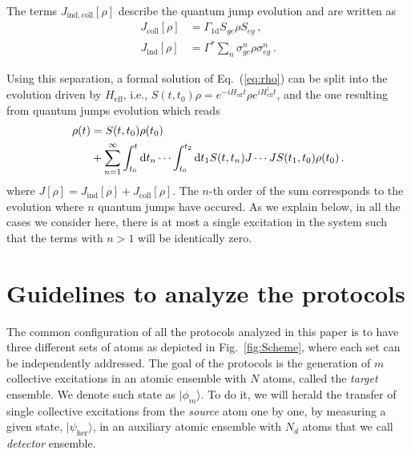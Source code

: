 \documentclass[twocolumn,pra,aps,superscriptaddress,showpacs]{revtex4-1}
\newcommand{\ket}[1]{|#1\rangle}
\def\oned{\mathrm{1d}}
\def\dd{\mathord{\rm d}}
\begin{document}
The terms $J_{\mathrm{ind},\mathrm{coll}}[\rho]$ describe the quantum jump evolution and are written as
%
\begin{align}\label{eq:qjump}
J_\mathrm{coll}[\rho]
	&=\Gamma_\oned S_{ge}\rho S_{eg}\,,\\
J_\mathrm{ind}[\rho]
	&=\Gamma^* \sum_n \sigma^n_{ge}\rho \sigma^n_{eg}\,.
\end{align}

Using this separation, a formal solution of Eq.~(\ref{eq:rho}) can be split into the evolution driven by $H_\mathrm{eff}$, i.e., $S(t,t_0)\rho=e^{-i H_{\mathrm{eff}} t}\rho e^{i H_{\mathrm{eff}}^\dagger t}$, and the one resulting from quantum jumps evolution which reads
%
\begin{align} \label{eq:unravel}
\rho(t)
	&= S(t,t_0)\rho(t_0) \\
	& +\sum_{n=1}^\infty \int_{t_0}^t \dd t_n \cdots\int_{t_0}^{t_2} \dd t_1 
			S(t,t_n) J \cdots J S(t_1,t_0)\rho(t_0) \,. \nonumber
\end{align}
%
where $J[\rho]=J_\mathrm{ind}[\rho]+J_\mathrm{coll}[\rho]$. The $n$-th order of the sum corresponds to the evolution where $n$ quantum jumps have occured. As we explain below, in all the cases we consider here, there is at most a single excitation in the system such that the terms with $n>1$ will be identically zero.

\section{Guidelines to analyze the protocols}\label{sec:theory}

The common configuration of all the protocols analyzed in this paper is to have three different sets of atoms as depicted in Fig.~\ref{fig:Scheme}, where each set can be independently addressed. The goal of the protocols is the generation of $m$ collective excitations in an atomic ensemble with $N$ atoms, called the \emph{target} ensemble. We denote such state as $\ket{\phi_m}$. To do it, we will herald the transfer of single collective excitations from the \emph{source} atom one by one, by measuring a given state, $\ket{\psi_{\mathrm{her}}}$, in an auxiliary atomic ensemble with $N_d$ atoms that we call \emph{detector} ensemble.
\end{document}
